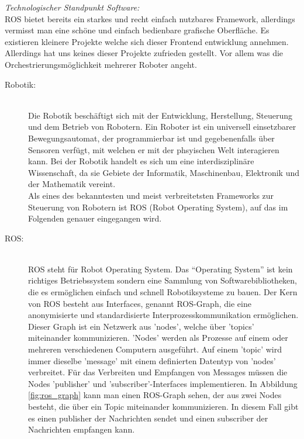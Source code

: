 \begin{flushleft}
    \textit{Technologischer Standpunkt Software:}\\
    ROS bietet bereits ein starkes und recht einfach nutzbares Framework, allerdings vermisst man eine 
    schöne und einfach bedienbare grafische Oberfläche.
    Es existieren kleinere Projekte welche sich dieser Frontend entwicklung annehmen. 
    Allerdings hat uns keines dieser Projekte zufrieden gestellt. 
    Vor allem was die Orchestrierungsmöglichkeit mehrerer Roboter angeht.

    \begin{description}
        \item[Robotik:]\hfill\\
        Die Robotik beschäftigt sich mit der Entwicklung, Herstellung, Steuerung und dem Betrieb von Robotern.
        Ein Roboter ist ein universell einsetzbarer Bewegungsautomat, der programmierbar ist und gegebenenfalls über Sensoren verfügt,
        mit welchen er mit der phsyischen Welt interagieren kann.
        Bei der Robotik handelt es sich um eine interdisziplinäre Wissenschaft, da sie Gebiete der Informatik, Maschinenbau, Elektronik und der Mathematik vereint. 
        \cite{robotik_konradin}\\
        Als eines des bekanntesten und meist verbreitetsten Frameworks zur Steuerung von Robotern ist ROS (Robot Operating System), auf das im Folgenden genauer eingegangen wird.

        \item[ROS:]\hfill\\
        ROS steht für Robot Operating System. Das ``Operating System'' ist kein richtiges Betriebssystem sondern eine Sammlung von Softwarebibliotheken, die es ermöglichen einfach und schnell Robotiksysteme zu bauen.
        Der Kern von ROS besteht aus Interfaces, genannt ROS-Graph, die eine anonymisierte und standardisierte Interprozesskommunikation ermöglichen.
        Dieser Graph ist ein Netzwerk aus 'nodes', welche über 'topics' miteinander kommunizieren. 'Nodes' werden als Prozesse auf einem oder mehreren verschiedenen Computern ausgeführt.
        Auf einem 'topic' wird immer dieselbe 'message' mit einem definierten Datentyp von 'nodes' verbreitet. 
        Für das Verbreiten und Empfangen von Messages müssen die Nodes 'publisher' und 'subscriber'-Interfaces implementieren.
        In Abbildung \ref{fig:ros_graph} kann man einen ROS-Graph sehen, der aus zwei Nodes besteht, die über ein Topic miteinander kommunizieren.
        In diesem Fall gibt es einen publisher der Nachrichten sendet und einen subscriber der Nachrichten empfangen kann.


\end{description}
\end{flushleft}
